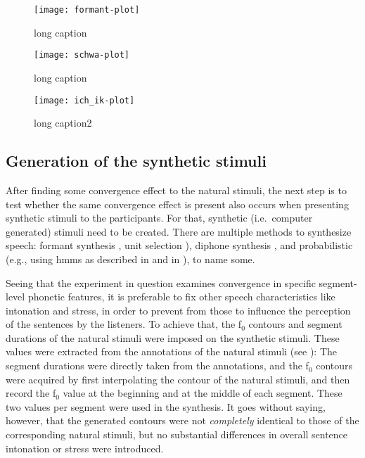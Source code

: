 \begin{figure}[!t]
	\centering
	\texttt{[image: formant-plot]}
	\caption[short caption]{long caption}
	\label{fig:HCIConvFormants}
\end{figure}


\begin{figure}[!t]
	\centering
	\texttt{[image: schwa-plot]}
	\caption[short caption]{long caption}
	\label{fig:HCIConvSchwaPlot}
\end{figure}

\begin{figure}[!t]
	\centering
	\texttt{[image: ich\_ik-plot]}
	\caption[short caption]{long caption2}
	\label{fig:HCIConvIcIkPlot}
\end{figure}

\subsection{Generation of the synthetic stimuli}
\label{subsec:generation_stimuli_hci}

After finding some convergence effect to the natural stimuli, the next step is to test whether the same convergence effect is present also occurs when presenting synthetic stimuli to the participants.
For that, synthetic (i.e.\ computer generated) stimuli need to be created.
There are multiple methods to synthesize speech:
formant synthesis \citep[e.g.][]{Burkhardt2000verification}, unit selection \citep{Hunt1996unit,Black2003unit}), diphone synthesis \citep{Dutoit1996mbrola}, and probabilistic (e.g., using \acp{hmm} as described in \citet{Zen2005overview} and in \citet{Zen2009statistical}), to name some.

Seeing that the experiment in question examines convergence in specific segment-level phonetic features, it is preferable to fix other speech characteristics like intonation and stress, in order to prevent from those to influence the perception of the sentences by the listeners.
To achieve that, the f$_0$ contours and segment durations of the natural stimuli were imposed on the synthetic stimuli.
These values were extracted from the annotations of the natural stimuli (see \citet{Gessinger2016PundP}):
The segment durations were directly taken from the annotations, and the f$_0$ contours were acquired by first interpolating the contour of the natural stimuli, and then record the f$_0$ value at the beginning and at the middle of each segment.
These two values per segment were used in the synthesis.
It goes without saying, however, that the generated contours were not \emph{completely} identical to those of the corresponding natural stimuli, but no substantial differences in overall sentence intonation or stress were introduced.

